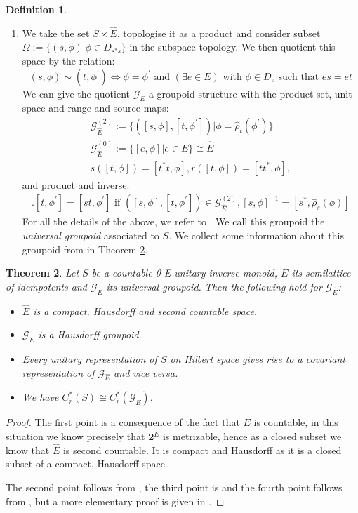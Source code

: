 \documentclass[11pt]{amsart}
\theoremstyle{plain}
\newtheorem{theorem}{Theorem}%
\theoremstyle{definition}%
\newtheorem{definition}[theorem]{Definition}%
\theoremstyle{remark}%
\newcommand{\G}{\mathcal{G}}
\newcommand{\E}{\widehat{E}}
\begin{document}
\begin{definition}
\begin{enumerate}
\item We take the set $S \times \E$, topologise it as a product and consider subset $\Omega:= \lbrace (s, \phi) | \phi \in D_{s^{*}s} \rbrace$ in the subspace topology. We then quotient this space by the relation:
\begin{equation*}
(s, \phi) \sim (t, \phi^{'}) \Leftrightarrow \phi=\phi^{'} \mbox{ and } (\exists e \in E) \mbox{ with } \phi \in D_{e} \mbox{ such that } es=et
\end{equation*}
We can give the quotient $\G_{\E}$ a groupoid structure with the product set, unit space and range and source maps:
\begin{eqnarray*}
\G_{\E}^{(2)}:=\lbrace ([s,\phi],[t,\phi^{'}]) | \phi=\widehat{\rho}_{t}(\phi^{'}) \rbrace \\
\G_{\E}^{(0)}:= \lbrace [e,\phi] | e \in E \rbrace \cong \E \\
s([t,\phi])=[t^{*}t,\phi], r([t,\phi])=[tt^{*},\phi], 
\end{eqnarray*}
and product and inverse:
\begin{eqnarray*}
[s,\phi].[t,\phi^{'}]= [st,\phi^{'}] \mbox{ if } ([s,\phi],[t,\phi^{'}]) \in \G_{\E}^{(2)}, [s,\phi]^{-1} = [s^{*},\widehat{\rho}_{s}(\phi)] 
\end{eqnarray*}
For all the details of the above, we refer to \cite[Section 4]{MR2419901}. We call this groupoid the \textit{universal groupoid} associated to $S$. We collect some information about this groupoid from \cite{MR2419901,MR1724106} in Theorem \ref{Thm:Info}.
\end{enumerate}
\end{definition}

\begin{theorem}\label{Thm:Info}
Let $S$ be a countable 0-E-unitary inverse monoid, $E$ its semilattice of idempotents and $\G_{\E}$ its universal groupoid. Then the following hold for $\G_{\E}$:
\begin{itemize}
\item $\E$ is a compact, Hausdorff and second countable space.
\item $\G_{\E}$ is a Hausdorff groupoid.
\item Every unitary representation of $S$ on Hilbert space gives rise to a covariant representation of $\G_{\E}$ and vice versa.
\item We have $C^{*}_{r}(S) \cong C^{*}_{r}(\G_{\E})$.
\end{itemize}
\end{theorem}
\begin{proof}
The first point is a consequence of the fact that $E$ is countable, in this situation we know precisely that $\textbf{2}^{E}$ is metrizable, hence as a closed subset we know that $\E$ is second countable. It is compact and Hausdorff as it is a closed subset of a compact, Hausdorff space.

The second point follows from \cite[Corollary 10.9]{MR2419901}, the third point is \cite[Corollary 10.16]{MR2419901} and the fourth point follows from \cite[Theorem ...]{MR1724106}, but a more elementary proof is given in \cite{MR1900993}.
\end{proof}
\end{document}
